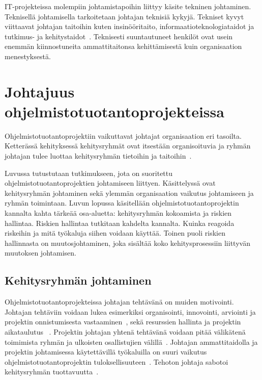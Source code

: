\documentclass[finnish]{tktltiki2}
\theoremstyle{definition}
\theoremstyle{remark}
\begin{document}
IT-projekteissa molempiin johtamistapoihin liittyy käsite tekninen johtaminen. Teknisellä johtamisella tarkoitetaan johtajan teknisiä kykyjä. Tekniset kyvyt viittaavat johtajan taitoihin kuten insinööritaito, informaatioteknologiataidot ja tutkimus- ja kehitystaidot~\cite{thite2000leadership}. Teknisesti suuntautuneet henkilöt ovat usein enemmän kiinnostuneita ammattitaitonsa kehittämisestä kuin organisaation menestyksestä. 

   



  


\section{Johtajuus ohjelmistotuotantoprojekteissa}

Ohjelmistotuotantoprojektiin vaikuttavat johtajat organisaation eri tasoilta. Ketterässä kehityksessä kehitysryhmät ovat  itsestään organisoituvia ja ryhmän johtajan tulee luottaa kehitysryhmän tietoihin ja taitoihin~\cite{fowler2001agile}.

Luvussa tutustutaan tutkimukseen, jota on suoritettu ohjelmistotuotantoprojektien johtamiseen liittyen. Käsittelyssä ovat kehitysryhmän johtaminen sekä ylemmän organisaation vaikutus johtamiseen ja ryhmän toimintaan. Luvun lopussa käsitellään ohjelmistotuotantoprojektin kannalta kahta tärkeää osa-aluetta: kehitysryhmän kokoamista ja riskien hallintaa. Riskien hallintaa tutkitaan kahdelta kannalta. Kuinka reagoida riskeihin ja mitä työkaluja siihen voidaan käyttää. Toinen puoli riskien hallinnasta on muutosjohtaminen, joka sisältää koko kehitysprosessiin liittyvän muutoksen johtamisen.

\subsection{Kehitysryhmän johtaminen}

Ohjelmistotuotantoprojekteissa johtajan tehtävänä on muiden motivointi. Johtajan tehtäviin voidaan lukea esimerkiksi organisointi, innovointi, arviointi ja projektin onnistumisesta vastaaminen~\cite{4017705}, sekä resurssien hallinta ja projektin aikataulutus ~\cite{Dhomne:2012:ITL:2382887.2382899}. Projektin johtajan yhtenä tehtävänä voidaan pitää välikätenä toimimista ryhmän ja ulkoisten osallistujien välillä~\cite{McLeod:2011:FAS:1978802.1978803}. Johtajan ammattitaidolla ja projektin johtamisessa käytettävillä työkaluilla on suuri vaikutus ohjelmistotuotantoprojektin tuloksellisuuteen~\cite{McLeod:2011:FAS:1978802.1978803}. Tehoton johtaja sabotoi kehitysryhmän tuottavuutta~\cite{bradley1997effect}.
\end{document}
